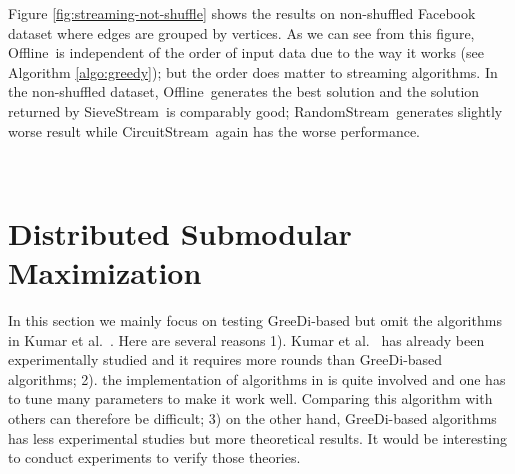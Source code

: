 \documentclass[11pt]{article}
\newcommand{\eps}{\epsilon}
\newcommand{\sieveStream}{{\sc SieveStream}~}
\newcommand{\randomStream}{{\sc RandomStream}~}
\newcommand{\circuitStream}{{\sc CircuitStream}~}
\newcommand{\offline}{{\sc Offline}~}
\begin{document}
Figure \ref{fig:streaming-not-shuffle} shows the results on non-shuffled {\sc Facebook} dataset where edges are grouped by vertices. As we can see from this figure, \offline is independent of  the order of input data due to the way it works (see Algorithm \ref{algo:greedy}); but the order does matter to streaming algorithms. In the non-shuffled dataset, \offline generates the best solution and the solution returned by \sieveStream is comparably good; \randomStream generates slightly worse result while  \circuitStream  again has the worse performance.



\begin{figure*}[h!]
     \centering
     ~~
     \caption{Streaming Algorithms on {\sc Facebook};  $\eps$ is set to be $0.2$ for both \sieveStream and \randomStream; $\gamma$ is set to be $1.0$ for \circuitStream.}
     \label{fig:streaming-facebook}
\end{figure*}








\section{Distributed Submodular Maximization}
\label{sec:distributed}
In this section we mainly focus on testing {\sc GreeDi}-based but omit the algorithms in Kumar et al.\ \cite{KMV+15}. Here are several reasons 1). Kumar et al.\ \cite{KMV+15} has already been experimentally studied and it requires more rounds than {\sc GreeDi}-based algorithms; 2). the implementation of algorithms in \cite{KMV+15} is quite involved and one has to tune many parameters to make it work well. Comparing this algorithm  with others can therefore be difficult;  3) on the other hand, {\sc GreeDi}-based algorithms has less experimental studies but more theoretical results. It would be interesting to conduct experiments to verify those theories.
\end{document}
